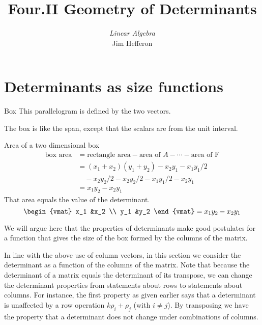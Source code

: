 \documentclass[10pt,t,serif,professionalfont]{beamer}
\title[Geometry of Determinants] %
{Four.II Geometry of Determinants}
\author{\textit{Linear Algebra} \\ {\small Jim Hef{}feron}}
\institute{
  \texttt{http://joshua.smcvt.edu/linearalgebra}
}
\date{}
\begin{document}
\begin{frame}
  \titlepage
\end{frame}




\section{Determinants as size functions}
\begin{frame}{Box}
This parallelogram is defined by the two vectors.

\df[df:Box]

\medskip
The box is like the span, except that the scalars are from the unit 
interval. 
\end{frame}
\begin{frame}{Area of a two dimensional box}
\begin{align*}
  \text{box area}
  &=\text{rectangle area}-\text{area of $A$}-\cdots-\text{area of F} \\
  &=(x_1+x_2)(y_1+y_2)-x_2y_1-x_1y_1/2        \\
    &\quad-x_2y_2/2-x_2y_2/2-x_1y_1/2-x_2y_1         \\
  &=x_1y_2-x_2y_1        
\end{align*}
\pause
That area equals the value of the determinant.
\begin{equation*}
  \begin{vmat}
    x_1  &x_2  \\
    y_1  &y_2
  \end{vmat}
  =x_1y_2-x_2y_1
\end{equation*}
\end{frame}
\begin{frame}
We will argue here that
the properties of determinants 
make good postulates for a function 
that gives the size of the box formed by the columns of the matrix.  

\pause
In line with the above use of column vectors,
in this section we consider the determinant as a function of the columns
of the matrix.
Note that because the determinant of a matrix equals 
the determinant of its transpose, we can change the determinant properties
from statements about rows to statements about columns.
For instance, the first property as given earlier says that a
determinant is unaffected by a row operation $k\rho_i+\rho_j$ (with $i\neq j$).
By transposing we have the property that a determinant
does not change under combinations of columns. 
\end{frame}
\end{document}
